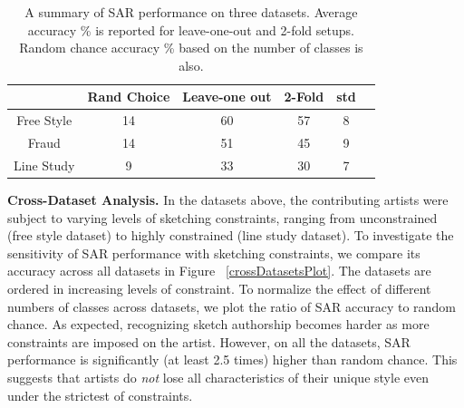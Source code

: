 

\begin{table}[htbp!]
\caption {A summary of SAR performance on three datasets. Average accuracy \% is reported for leave-one-out and 2-fold setups. Random chance accuracy \% based on the number of classes is also.}
\label{table:accuracy}
\vspace{-2mm}
\centering
\small
\begin{tabular}{cccccc}
&Rand Choice &Leave-one out & 2-Fold &std \\ \hline

Free Style           & 14 & 60 & 57 & 8\\
Fraud                & 14 & 51 & 45 & 9\\
Line Study           & 9  & 33 & 30 & 7\\
\end{tabular}
\end{table}

\noindent\textbf{Cross-Dataset Analysis.} In the datasets above, the contributing artists were subject to varying levels of sketching constraints, ranging from unconstrained (free style dataset) to highly constrained (line study dataset). To investigate the sensitivity of SAR performance with sketching constraints, we compare its accuracy across all datasets in Figure ~\ref{crossDatasetsPlot}. The datasets are ordered in increasing levels of constraint. To normalize the effect of different numbers of classes across datasets, we plot the ratio of SAR accuracy to random chance. As expected, recognizing sketch authorship becomes harder as more constraints are imposed on the artist. However, on all the datasets, SAR performance is significantly (at least 2.5 times) higher than random chance. This suggests that artists do \emph{not} lose all characteristics of their unique style even under the strictest of constraints.

